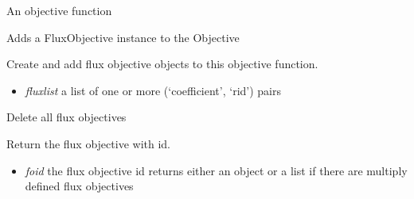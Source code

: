 \documentclass[a4paper,11pt,english]{sphinxmanual}
\begin{document}

\begin{fulllineitems}
\label{modules_doc:cbmpy.CBModel.Objective}
An objective function

\begin{fulllineitems}
\label{modules_doc:cbmpy.CBModel.Objective.addFluxObjective}
Adds a FluxObjective instance to the Objective

\end{fulllineitems}


\begin{fulllineitems}
\label{modules_doc:cbmpy.CBModel.Objective.createFluxObjectives}
Create and add flux objective objects to this objective function.
\begin{itemize}
\item {} 
\emph{fluxlist} a list of one or more (`coefficient', `rid') pairs

\end{itemize}

\end{fulllineitems}


\begin{fulllineitems}
\label{modules_doc:cbmpy.CBModel.Objective.deleteAllFluxObjectives}
Delete all flux objectives

\end{fulllineitems}


\begin{fulllineitems}
\label{modules_doc:cbmpy.CBModel.Objective.getFluxObjective}
Return the flux objective with id.
\begin{itemize}
\item {} 
\emph{foid} the flux objective id returns either an object or a list if there are multiply defined flux objectives


\end{itemize}
\end{fulllineitems}
\end{fulllineitems}
\end{document}
